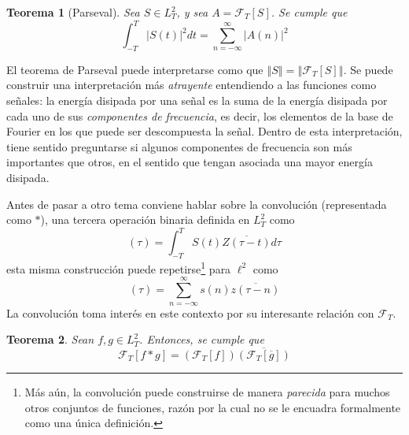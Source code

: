 \documentclass[12pt,letterpaper]{book}
\newtheorem{teorema}{Teorema}[chapter]
\newcommand{\abso}[1]{\left| #1 \right|}
\newcommand{\norma}[1]{\left\Vert #1 \right\Vert}
\begin{document}
\begin{teorema}[Parseval]
Sea $S \in L^{2}_T$, y sea $A = \mathcal{F}_T[S]$. Se cumple que
\begin{equation*}
\int_{-T}^{T} \abso{S(t)}^{2} dt = \sum_{n=-\infty}^{\infty} \abso{A(n)}^{2}
\end{equation*}
\label{parseval}
\end{teorema}

El teorema de Parseval puede interpretarse como que $\norma{S} = \norma{\mathcal{F}_T[S]}$.
%
Se puede construir una interpretación más \textit{atrayente} entendiendo a las funciones como señales:
la energía disipada por una señal es la suma de la energía disipada por cada uno de sus \textit{componentes de frecuencia}, es decir, los elementos de la base de Fourier en los que puede ser descompuesta la señal.
%
Dentro de esta interpretación, tiene sentido preguntarse si algunos componentes de frecuencia son más importantes que otros, en el sentido que tengan asociada una mayor energía disipada.

Antes de pasar a otro tema conviene hablar sobre la convolución (representada como $\ast$), una tercera operación binaria definida en $L^{2}_T$ como
\begin{equation}
[S \ast Z] (\tau) = \int_{-T}^{T} S(t) \overline{Z(\tau-t)} d\tau
\end{equation}
esta misma construcción puede repetirse\footnote{Más aún, la convolución puede construirse de manera \textit{parecida} para muchos otros conjuntos de funciones, razón por la cual no se le encuadra formalmente como una única definición.} para $\ell^{2}$ como
\begin{equation}
[s \ast z] (\tau) = \sum_{n=-\infty}^{\infty} s(n) \overline{z(\tau-n)}
\end{equation}
La convolución toma interés en este contexto por su interesante relación con $\mathcal{F}_T$.

\begin{teorema}
Sean $f, g \in L^{2}_T$. Entonces, se cumple que
\begin{equation}
\mathcal{F}_T[f \ast g] = \left( \mathcal{F}_T[f] \right) \overline{\left( \mathcal{F}_T[\overline{g}] \right)}
\end{equation}
\end{teorema}
\end{document}
